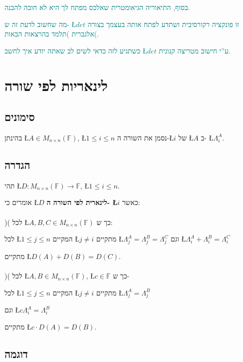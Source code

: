 \documentclass[english,hebrew]{article}
\newcommand{\sqrmn}{M_{n\times n}(\mathbb{F})}
\begin{document}
\textcolor{teal}{בסוף, התיאוריה הגיאומטרית שאלכס מפתח לך היא לא
חובה להבנה.}

\textcolor{teal}{מה שחשוב לדעת זה ש- \L{$det$} זו פונקציה רקורסיבית
ושתדע לפתח אותה בעצמך בצורה אלגברית )תלמד בהרצאות הבאות(.}

\textcolor{teal}{כשתגיע לזה כדאי לשים לב שאתה יודע איך לחשב \L{$det$}
ע\textquotedblright י חישוב מטריצה קנונית.}\textcolor{gray}{{} }

\section{לינאריות לפי שורה}

\subsection{סימונים}

בהינתן \L{$A\in\sqrmn$}, \L{$1\leq i\leq n$} נסמן את השורה ה-\L{$i$}
של \L{$A$} ב- \L{$\Lambda_{i}^{A}$}.

\subsection{הגדרה}

תהי \L{$D:M_{n\times n}(\mathbb{F})\rightarrow\mathbb{F}$}, \L{$1\leq i\leq n$}.

אומרים כי \L{$D$} \textbf{לינארית לפי השורה ה- \L{$i$}} כאשר:\\
\\
){\endL}( לכל \L{$A,B,C\in M_{n\times n}(\mathbb{F})$} כך
ש:

\qquad{}לכל \L{$1\leq j\leq n$} המקיים \L{$j\neq i$} מתקיים \L{$\Lambda_{j}^{A}=\Lambda_{j}^{B}=\Lambda_{j}^{C}$}
\qquad{}וגם \L{$\Lambda_{i}^{A}+\Lambda_{i}^{B}=\Lambda_{i}^{C}$}

מתקיים \L{$D(A)+D(B)=D(C)$}.\\
\\
){\endL}( לכל \L{$A,B\in\sqrmn$}, \L{$c\in\mathbb{F}$}
כך ש-

\qquad{}לכל \L{$1\leq j\leq n$} המקיים \L{$j\neq i$} מתקיים \L{$\Lambda_{j}^{A}=\Lambda_{j}^{B}$}

\qquad{}וגם \L{$c\Lambda_{i}^{A}=\Lambda_{i}^{B}$}

מתקיים \L{$c\cdot D(A)=D(B)$}.

\subsection{דוגמה}
\end{document}
